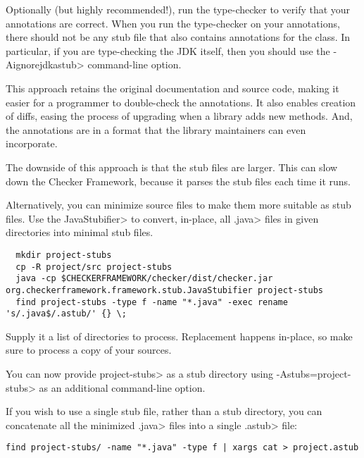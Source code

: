 Optionally (but highly recommended!), run the type-checker to verify that
your annotations are correct.  When you run the type-checker on your
annotations, there should not be any stub file that also contains
annotations for the class.  In particular, if you are type-checking the JDK
itself, then you should use the \<-Aignorejdkastub> command-line option.

This approach retains the original
documentation and source code, making it easier for a programmer to
double-check the annotations.  It also enables creation of diffs, easing
the process of upgrading when a library adds new methods.  And, the
annotations are in a format that the library maintainers can even
incorporate.

The downside of this approach is that the stub files are larger.  This can
slow down the Checker Framework, because it parses the stub files each time
it runs.

Alternatively, you can minimize source files to make them more suitable as stub files.
Use the \<JavaStubifier> to convert, in-place, all \<.java> files in given directories into
minimal stub files.

\begin{Verbatim}
  mkdir project-stubs
  cp -R project/src project-stubs
  java -cp $CHECKERFRAMEWORK/checker/dist/checker.jar org.checkerframework.framework.stub.JavaStubifier project-stubs
  find project-stubs -type f -name "*.java" -exec rename 's/.java$/.astub/' {} \;
\end{Verbatim}

Supply it a list of directories to process. Replacement happens in-place, so make sure to
process a copy of your sources.

You can now provide \<project-stubs> as a stub directory using \<-Astubs=project-stubs> as
an additional command-line option.

If you wish to use a single stub file, rather than a stub directory,
you can concatenate all the minimized \<.java> files into a single \<.astub> file:

\begin{Verbatim}
find project-stubs/ -name "*.java" -type f | xargs cat > project.astub
\end{Verbatim}



